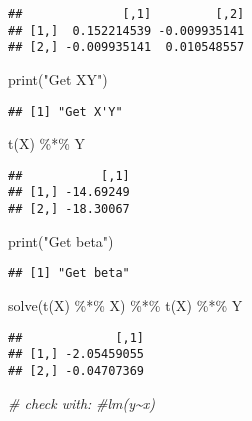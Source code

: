 \documentclass[
]{article}
\newenvironment{Shaded}{\begin{snugshade}}{\end{snugshade}}
\newcommand{\CommentTok}[1]{\textcolor[rgb]{0.56,0.35,0.01}{\textit{#1}}}
\newcommand{\FunctionTok}[1]{\textcolor[rgb]{0.00,0.00,0.00}{#1}}
\newcommand{\NormalTok}[1]{#1}
\newcommand{\SpecialCharTok}[1]{\textcolor[rgb]{0.00,0.00,0.00}{#1}}
\newcommand{\StringTok}[1]{\textcolor[rgb]{0.31,0.60,0.02}{#1}}
\begin{document}
\begin{verbatim}
##              [,1]         [,2]
## [1,]  0.152214539 -0.009935141
## [2,] -0.009935141  0.010548557
\end{verbatim}

\begin{Shaded}
\begin{Highlighting}[]
\FunctionTok{print}\NormalTok{(}\StringTok{"Get X\textquotesingle{}Y"}\NormalTok{)}
\end{Highlighting}
\end{Shaded}

\begin{verbatim}
## [1] "Get X'Y"
\end{verbatim}

\begin{Shaded}
\begin{Highlighting}[]
\FunctionTok{t}\NormalTok{(X) }\SpecialCharTok{\%*\%}\NormalTok{ Y}
\end{Highlighting}
\end{Shaded}

\begin{verbatim}
##           [,1]
## [1,] -14.69249
## [2,] -18.30067
\end{verbatim}

\begin{Shaded}
\begin{Highlighting}[]
\FunctionTok{print}\NormalTok{(}\StringTok{"Get beta"}\NormalTok{)}
\end{Highlighting}
\end{Shaded}

\begin{verbatim}
## [1] "Get beta"
\end{verbatim}

\begin{Shaded}
\begin{Highlighting}[]
\FunctionTok{solve}\NormalTok{(}\FunctionTok{t}\NormalTok{(X) }\SpecialCharTok{\%*\%}\NormalTok{ X) }\SpecialCharTok{\%*\%} \FunctionTok{t}\NormalTok{(X) }\SpecialCharTok{\%*\%}\NormalTok{ Y}
\end{Highlighting}
\end{Shaded}

\begin{verbatim}
##             [,1]
## [1,] -2.05459055
## [2,] -0.04707369
\end{verbatim}

\begin{Shaded}
\begin{Highlighting}[]
\CommentTok{\# check with:}
\CommentTok{\#lm(y\textasciitilde{}x)}
\end{Highlighting}
\end{Shaded}
\end{document}

